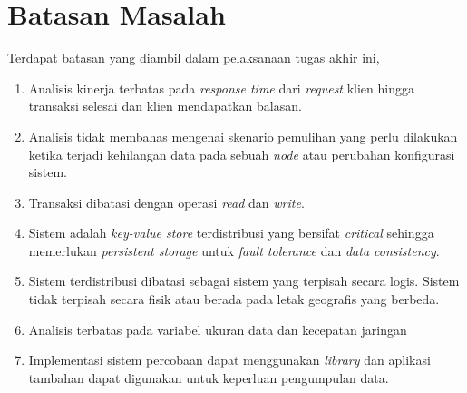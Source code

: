 \section{Batasan Masalah}
\label{sec:batasan-masalah}

Terdapat batasan yang diambil dalam pelaksanaan tugas akhir ini,

\begin{enumerate}
    \item Analisis kinerja terbatas pada \textit{response time} dari \textit{request} klien hingga transaksi selesai dan klien mendapatkan balasan.
    \item Analisis tidak membahas mengenai skenario pemulihan yang perlu dilakukan ketika terjadi kehilangan data pada sebuah \textit{node} atau perubahan konfigurasi sistem. 
    \item Transaksi dibatasi dengan operasi \textit{read} dan \textit{write}.
    \item Sistem adalah \textit{key-value store} terdistribusi yang bersifat \textit{critical} sehingga memerlukan \textit{persistent storage} untuk \textit{fault tolerance} dan \textit{data consistency}.
    \item Sistem terdistribusi dibatasi sebagai sistem yang terpisah secara logis. Sistem tidak terpisah secara fisik atau berada pada letak geografis yang berbeda.
    \item Analisis terbatas pada variabel ukuran data dan kecepatan jaringan
    \item Implementasi sistem percobaan dapat menggunakan \textit{library} dan aplikasi tambahan dapat digunakan untuk keperluan pengumpulan data.
\end{enumerate}
